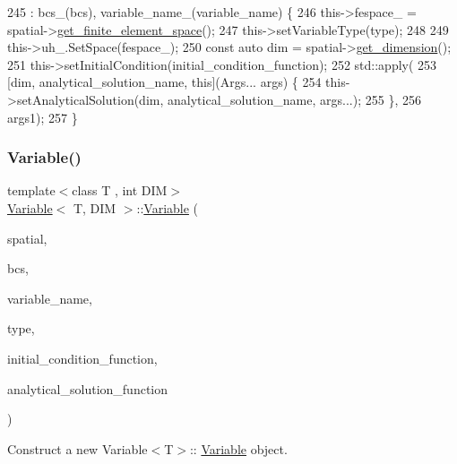\begin{DoxyCode}
245     : bcs\_(bcs), variable\_name\_(variable\_name) \{
246   this->fespace\_ = spatial->\hyperlink{classSpatialDiscretization_ac001fc2ff356fe8c0c2b49618e594a03}{get\_finite\_element\_space}();
247   this->setVariableType(type);
248 
249   this->uh\_.SetSpace(fespace\_);
250   \textcolor{keyword}{const} \textcolor{keyword}{auto} dim = spatial->\hyperlink{classSpatialDiscretization_a8d69dd3c7e36327396e626b27d98f96f}{get\_dimension}();
251   this->setInitialCondition(initial\_condition\_function);
252   std::apply(
253       [dim, analytical\_solution\_name, \textcolor{keyword}{this}](Args... args) \{
254         this->setAnalyticalSolution(dim, analytical\_solution\_name, args...);
255       \},
256       args1);
257 \}
\end{DoxyCode}
\mbox{\label{classVariable_acf7cb34f3ae57dc1ff44da2347125f88}} 
\subsubsection{\texorpdfstring{Variable()}{Variable()}\hspace{0.1cm}{\footnotesize\ttfamily [6/9]}}
{\footnotesize\ttfamily template$<$class T , int D\+IM$>$ \\
\hyperlink{classVariable}{Variable}$<$ T, D\+IM $>$\+::\hyperlink{classVariable}{Variable} (\begin{DoxyParamCaption}\item[{\hyperlink{classSpatialDiscretization}{Spatial\+Discretization}$<$ T, D\+IM $>$ $\ast$}]{spatial,  }\item[{const \hyperlink{classBoundaryConditions}{Boundary\+Conditions}$<$ T, D\+IM $>$ \&}]{bcs,  }\item[{const std\+::string \&}]{variable\+\_\+name,  }\item[{const std\+::string \&}]{type,  }\item[{const mfem\+::\+Function\+Coefficient \&}]{initial\+\_\+condition\+\_\+function,  }\item[{const mfem\+::\+Function\+Coefficient \&}]{analytical\+\_\+solution\+\_\+function }\end{DoxyParamCaption})}



Construct a new Variable$<$\+T$>$\+:\+: \hyperlink{classVariable}{Variable} object. 


